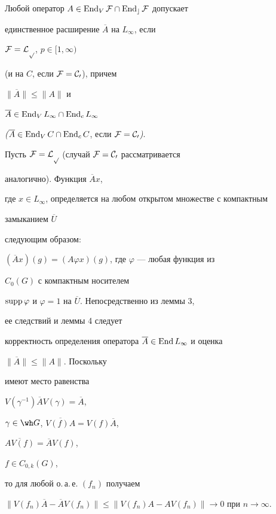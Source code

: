 \begin{lem} Любой оператор $A\in\operatorname{End}_V\cal F\cap\operatorname{End}_c\cal F$ допускает 


единственное расширение $\overline A$ на $L_\infty$, если 


$\cal F=L_p$, $p\in[1,\infty)$ 


(и на $C$, если $\cal F=C_0$), причем 


$\|\overline A\|\le\|A\|$ и 


$\overline A\in\operatorname{End}_V L_\infty\cap\operatorname{End}_c L_\infty$ 


{\em (}$\overline A\in\operatorname{End}_V C\cap\operatorname{End}_c C$, если $\cal F=C_0${\em )}. 


\end{lem} 


 


\begin{pf} Пусть $\cal F=L_p$ (случай $\cal F=C_0$ рассматривается 


аналогично). Функция $\overline Ax$, 


где $x\in L_\infty$, определяется на любом открытом множестве с компактным 


замыканием $\overline U$ 


следующим образом: 


$(\overline Ax)(g)=(A\varphi x)(g)$, где $\varphi$ --- любая функция из 


$C_0(G)$ с компактным носителем 


$\operatorname{supp}\varphi$ и $\varphi=1$ на $\overline U$. Непосредственно из леммы 3, 


ее следствий и леммы 4 следует 


корректность определения оператора $\overline A\in\operatorname{End} L_\infty$ и оценка 


$\|\overline A\|\le\|A\|$. Поскольку 


имеют место равенства 


$V(\gamma^{-1})\overline AV(\gamma)=\overline A$, 


$\gamma\in\wh G$, $\overline{V(f)A}=V(f)\overline A$, 


$\overline{AV(f)}=\overline AV(f)$, 


$f\in C_{0,k}(G)$, 


то для любой о.\,а.\,е. $(f_n)$ получаем 


$\|V(f_n)\overline A-\overline AV(f_n)\|\le 


\|V(f_n)A-AV(f_n)\|\to 0$ при $n\to\infty$. 


\end{pf} 


